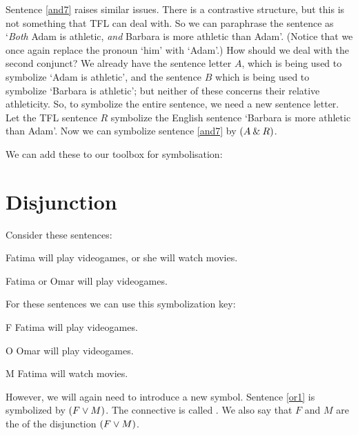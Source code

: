 Sentence \ref{and7} raises similar issues. There is a contrastive structure, but this is not something that TFL can deal with. So we can paraphrase the sentence as `\emph{Both} Adam is athletic, \emph{and} Barbara is more athletic than Adam'. (Notice that we once again replace the pronoun `him' with `Adam'.) How should we deal with the second conjunct? We already have the sentence letter $A$, which is being used to symbolize `Adam is athletic', and the sentence $B$ which is being used to symbolize `Barbara is athletic'; but neither of these concerns their relative athleticity. So, to symbolize the entire sentence, we need a new sentence letter. Let the TFL sentence $R$ symbolize the English sentence `Barbara is more athletic than Adam'. Now we can symbolize sentence \ref{and7} by $(A \mathbin{\&} R)$.

We can add these to our toolbox for symbolisation:



\section{Disjunction}

Consider these sentences:
	\begin{earg}
		\item[\ex{or1}] Fatima will play videogames, or she will watch movies.
		\item[\ex{or2}] Fatima or Omar will play videogames. 
	\end{earg}
For these sentences we can use this symbolization key:
	\begin{ekey}
		\item[F] Fatima will play videogames.
		\item[O] Omar will play videogames.
		\item[M] Fatima will watch movies.
	\end{ekey}
However, we will again need to introduce a new symbol. Sentence \ref{or1} is symbolized by $(F \vee M)$. The connective is called . We also say that $F$ and $M$ are the  of the disjunction $(F \vee M)$.

